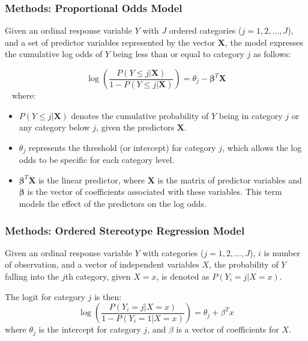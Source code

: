 \documentclass[xcolor=svgnames]{beamer}
\begin{document}
\begin{frame}\frametitle{Methods: Proportional Odds Model}

  Given an ordinal response variable $Y$ with $J$ ordered categories ($j=1, 2, \ldots, J$), 
  and a set of predictor variables represented by the vector $\mathbf{X}$, the model expresses 
  the cumulative log odds of $Y$ being less than or equal to category $j$ as follows:
  
  \[
  \log\left(\frac{P(Y \leq j | \mathbf{X})}{1 - P(Y \leq j | \mathbf{X})}\right) = \theta_j - \boldsymbol{\beta}^T\mathbf{X}
  \]
~\cite{mccullagh1980regression}
  where:
  {\small
    \begin{itemize}
        \item $P(Y \leq j | \mathbf{X})$ denotes the cumulative probability of $Y$ being in category $j$ or any category below $j$, given the predictors $\mathbf{X}$.
        \item $\theta_j$ represents the threshold (or intercept) for category $j$, which allows the log odds to be specific for each category level.
        \item $\boldsymbol{\beta}^T\mathbf{X}$ is the linear predictor, where $\mathbf{X}$ is the matrix of predictor variables and $\boldsymbol{\beta}$ is the vector of coefficients associated with these variables. This term models the effect of the predictors on the log odds.
    \end{itemize}
  }
  
  
\end{frame}


\begin{frame}\frametitle{Methods: Ordered Stereotype Regression Model}

  Given an ordinal response variable $Y$ with categories ($j=1, 2, \ldots, J$), $i$ is number of observation, and a vector of independent variables $X$, the probability of $Y$ falling into the $j$th category, given $X = x$, is denoted as $P(Y_i = j | X = x)$.

The logit for category $j$ is then:
\[
\log\left(\frac{P(Y_i = j | X = x)}{1 - P(Y_i = 1 | X = x)}\right) = \theta_j + \beta^T x
\]
where $\theta_j$ is the intercept for category $j$, and $\beta$ is a vector of coefficients for $X$.
~\cite{anderson1984regression}

\end{frame}

\end{document}
